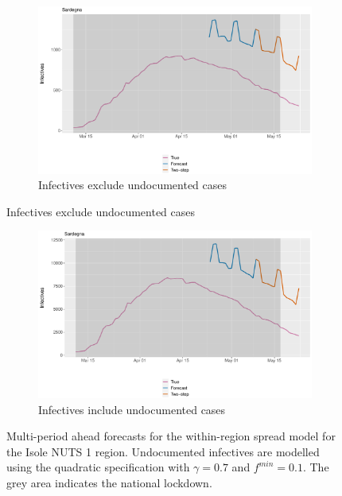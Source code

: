 \documentclass[12pt]{article}
\begin{document}
\begin{appendices}
        \begin{figure}[H]
    	    \centering
    	    \begin{subfigure}{\textwidth}
    	      \centering
    	      \includegraphics[width=0.91\linewidth]{output/model_within_lag14_forecast_full_Isole.pdf}
    	      \caption{Infectives exclude undocumented cases}
    	      \label{fig:forecast_full_within_isole_regular}
    	    \end{subfigure}
        \end{figure}
        \begin{figure}[H]\ContinuedFloat
    	    \begin{subfigure}{\textwidth}
    	      \centering
    	      \includegraphics[width=0.91\linewidth]{output/model_within_lag14_forecast_full_Isole_UndocQuadratic.pdf}
    	      \caption{Infectives include undocumented cases}
    	      \label{fig:forecast_full_within_isole_undoc}
    	    \end{subfigure}
    	    \caption{Multi-period ahead forecasts for the within-region spread model for the Isole NUTS 1 region. Undocumented infectives are modelled using the quadratic specification with $\gamma = 0.7$ and $f^{min}=0.1$. The grey area indicates the national lockdown.}
    	    \label{fig:forecast_full_within_isole}
        \end{figure}
		

\end{appendices}
\end{document}
